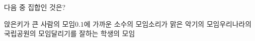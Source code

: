 다음 중 집합인 것은?
\begin{choicesv}{앉은키가 큰 사람의 모임}{$0.1$에 가까운 소수의 모임}{소리가 맑은 악기의 모임}{우리나라의 국립공원의 모임}{달리기를 잘하는 학생의 모임}\end{choicesv}
